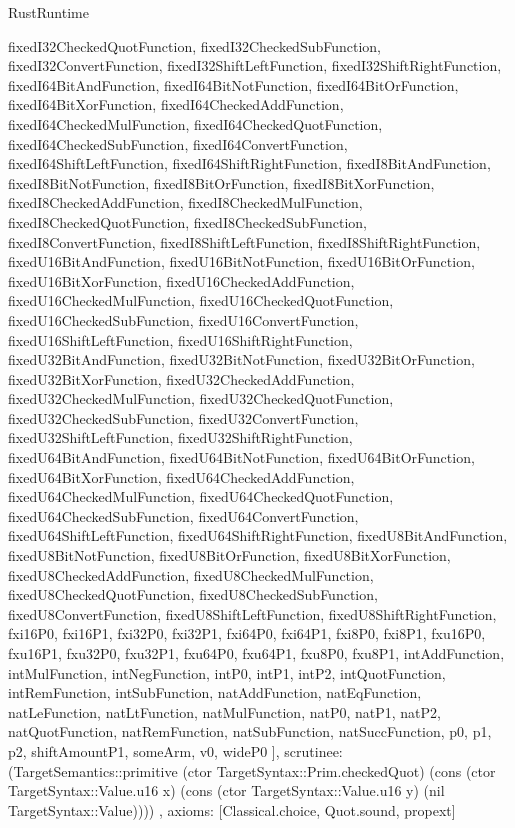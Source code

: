 \begin{lexlean}{RustRuntime}
\begin{semanticmodule}
{{      fixedI32CheckedQuotFunction,
      fixedI32CheckedSubFunction,
      fixedI32ConvertFunction,
      fixedI32ShiftLeftFunction,
      fixedI32ShiftRightFunction,
      fixedI64BitAndFunction,
      fixedI64BitNotFunction,
      fixedI64BitOrFunction,
      fixedI64BitXorFunction,
      fixedI64CheckedAddFunction,
      fixedI64CheckedMulFunction,
      fixedI64CheckedQuotFunction,
      fixedI64CheckedSubFunction,
      fixedI64ConvertFunction,
      fixedI64ShiftLeftFunction,
      fixedI64ShiftRightFunction,
      fixedI8BitAndFunction,
      fixedI8BitNotFunction,
      fixedI8BitOrFunction,
      fixedI8BitXorFunction,
      fixedI8CheckedAddFunction,
      fixedI8CheckedMulFunction,
      fixedI8CheckedQuotFunction,
      fixedI8CheckedSubFunction,
      fixedI8ConvertFunction,
      fixedI8ShiftLeftFunction,
      fixedI8ShiftRightFunction,
      fixedU16BitAndFunction,
      fixedU16BitNotFunction,
      fixedU16BitOrFunction,
      fixedU16BitXorFunction,
      fixedU16CheckedAddFunction,
      fixedU16CheckedMulFunction,
      fixedU16CheckedQuotFunction,
      fixedU16CheckedSubFunction,
      fixedU16ConvertFunction,
      fixedU16ShiftLeftFunction,
      fixedU16ShiftRightFunction,
      fixedU32BitAndFunction,
      fixedU32BitNotFunction,
      fixedU32BitOrFunction,
      fixedU32BitXorFunction,
      fixedU32CheckedAddFunction,
      fixedU32CheckedMulFunction,
      fixedU32CheckedQuotFunction,
      fixedU32CheckedSubFunction,
      fixedU32ConvertFunction,
      fixedU32ShiftLeftFunction,
      fixedU32ShiftRightFunction,
      fixedU64BitAndFunction,
      fixedU64BitNotFunction,
      fixedU64BitOrFunction,
      fixedU64BitXorFunction,
      fixedU64CheckedAddFunction,
      fixedU64CheckedMulFunction,
      fixedU64CheckedQuotFunction,
      fixedU64CheckedSubFunction,
      fixedU64ConvertFunction,
      fixedU64ShiftLeftFunction,
      fixedU64ShiftRightFunction,
      fixedU8BitAndFunction,
      fixedU8BitNotFunction,
      fixedU8BitOrFunction,
      fixedU8BitXorFunction,
      fixedU8CheckedAddFunction,
      fixedU8CheckedMulFunction,
      fixedU8CheckedQuotFunction,
      fixedU8CheckedSubFunction,
      fixedU8ConvertFunction,
      fixedU8ShiftLeftFunction,
      fixedU8ShiftRightFunction,
      fxi16P0,
      fxi16P1,
      fxi32P0,
      fxi32P1,
      fxi64P0,
      fxi64P1,
      fxi8P0,
      fxi8P1,
      fxu16P0,
      fxu16P1,
      fxu32P0,
      fxu32P1,
      fxu64P0,
      fxu64P1,
      fxu8P0,
      fxu8P1,
      intAddFunction,
      intMulFunction,
      intNegFunction,
      intP0,
      intP1,
      intP2,
      intQuotFunction,
      intRemFunction,
      intSubFunction,
      natAddFunction,
      natEqFunction,
      natLeFunction,
      natLtFunction,
      natMulFunction,
      natP0,
      natP1,
      natP2,
      natQuotFunction,
      natRemFunction,
      natSubFunction,
      natSuccFunction,
      p0,
      p1,
      p2,
      shiftAmountP1,
      someArm,
      v0,
      wideP0
    ],
    scrutinee: (TargetSemantics::primitive (ctor TargetSyntax::Prim.checkedQuot) (cons (ctor TargetSyntax::Value.u16 x) (cons (ctor TargetSyntax::Value.u16 y) (nil TargetSyntax::Value))))
  },
  axioms: [Classical.choice, Quot.sound, propext]
}


\end{semanticmodule}
\end{lexlean}
